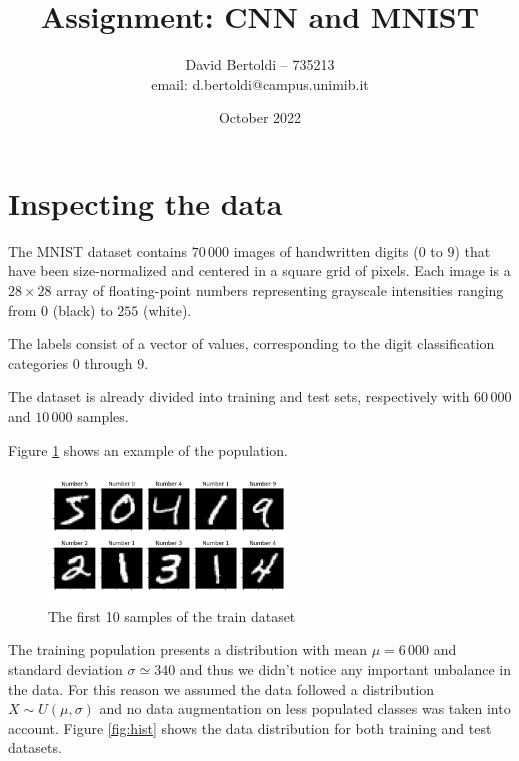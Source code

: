 \documentclass[compsoc]{IEEEtran}
\title{Assignment: CNN and MNIST}
\author{David Bertoldi -- 735213 \\ email: d.bertoldi@campus.unimib.it}
\affil{Department of Informatics, Systems and Communication}
\affil{University of Milano-Bicocca}
\date{October 2022}
\begin{document}
\maketitle 



\section{Inspecting the data}\label{sec:insp}
The MNIST dataset contains $70\,000$ images of handwritten digits ($0$ to $9$) that have been size-normalized and centered in a square grid of pixels. Each image is a $28 \times 28$ array of floating-point numbers representing grayscale intensities ranging from $0$ (black) to $255$ (white). \par
The labels consist of a vector of values, corresponding to the digit classification categories $0$ through $9$. \par
The dataset is already divided into training and test sets, respectively with $60\,000$ and $10\,000$ samples. \par

Figure \ref{fig:data} shows an example of the
population.

\begin{figure}[ht!]
\centering                                                                        
\includegraphics[width=2.5in]{data.png}
\captionsetup{justification=centering}                                                                                         
\caption{The first 10 samples of the train dataset}
\label{fig:data}                                                                                                                               
\end{figure}




The training population presents a distribution with mean $\mu = 6\,000$ and standard deviation $\sigma \simeq 340$ and thus we didn't notice any important unbalance in the data. For this reason we assumed the data followed a distribution $X \sim U(\mu, \sigma)$ and no data augmentation on less populated classes was taken into account. Figure \ref{fig:hist} shows the data distribution for both training and test datasets.
\end{document}
